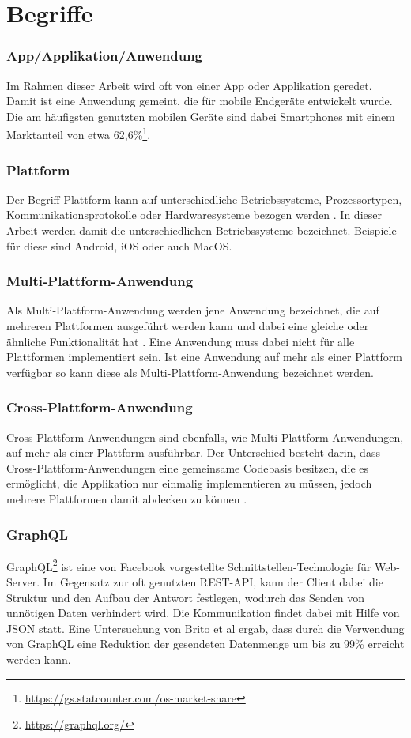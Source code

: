 \section{Begriffe}
\subsubsection{App/Applikation/Anwendung}
Im Rahmen dieser Arbeit wird oft von einer App oder Applikation geredet. Damit ist eine Anwendung gemeint, die für mobile Endgeräte entwickelt wurde. Die am häufigsten genutzten mobilen Geräte sind dabei Smartphones mit einem Marktanteil von etwa 62,6\%\footnote{\url{https://gs.statcounter.com/os-market-share}}.

\subsubsection{Plattform}
Der Begriff Plattform kann auf unterschiedliche Betriebssysteme, Prozessortypen, Kommunikationsprotokolle oder Hardwaresysteme bezogen werden \cite{2014Mulit_plattform_definition}. In dieser Arbeit werden damit die unterschiedlichen Betriebssysteme bezeichnet. Beispiele für diese sind Android, iOS oder auch MacOS.

\subsubsection{Multi-Plattform-Anwendung}
Als Multi-Plattform-Anwendung werden jene Anwendung bezeichnet, die auf mehreren Plattformen ausgeführt werden kann und dabei eine gleiche oder ähnliche Funktionalität hat \cite{2014Mulit_plattform_definition}. Eine Anwendung muss dabei nicht für alle Plattformen implementiert sein. Ist eine Anwendung auf mehr als einer Plattform verfügbar so kann diese als Multi-Plattform-Anwendung bezeichnet werden.

\subsubsection{Cross-Plattform-Anwendung}
Cross-Plattform-Anwendungen sind ebenfalls, wie Multi-Plattform Anwendungen, auf mehr als einer Plattform ausführbar. Der Unterschied besteht darin, dass Cross-Plattform-Anwendungen eine gemeinsame Codebasis besitzen, die es ermöglicht, die Applikation nur einmalig implementieren zu müssen, jedoch mehrere Plattformen damit abdecken zu können \cite{2014_Cross_plattform}.

\subsubsection{GraphQL}
GraphQL\footnote{\url{https://graphql.org/}} ist eine von Facebook vorgestellte Schnittstellen-Technologie für Web-Server. Im Gegensatz zur oft genutzten REST-API, kann der Client dabei die Struktur und den Aufbau der Antwort festlegen, wodurch das Senden von unnötigen Daten verhindert wird. Die Kommunikation findet dabei mit Hilfe von JSON statt. Eine Untersuchung von Brito et al \cite{IEEE_GraphQL} ergab, dass durch die Verwendung von GraphQL eine Reduktion der gesendeten Datenmenge um bis zu 99\% erreicht werden kann. 